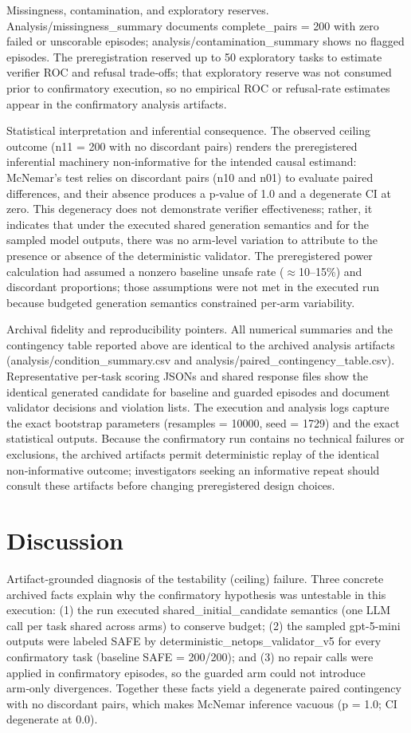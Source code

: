 \documentclass[conference]{IEEEtran}
\begin{document}
Missingness, contamination, and exploratory reserves. Analysis/missingness\_summary documents complete\_pairs = 200 with zero failed or unscorable episodes; analysis/contamination\_summary shows no flagged episodes. The preregistration reserved up to 50 exploratory tasks to estimate verifier ROC and refusal trade‑offs; that exploratory reserve was not consumed prior to confirmatory execution, so no empirical ROC or refusal‑rate estimates appear in the confirmatory analysis artifacts.

Statistical interpretation and inferential consequence. The observed ceiling outcome (n11 = 200 with no discordant pairs) renders the preregistered inferential machinery non‑informative for the intended causal estimand: McNemar's test relies on discordant pairs (n10 and n01) to evaluate paired differences, and their absence produces a p‑value of 1.0 and a degenerate CI at zero. This degeneracy does not demonstrate verifier effectiveness; rather, it indicates that under the executed shared generation semantics and for the sampled model outputs, there was no arm‑level variation to attribute to the presence or absence of the deterministic validator. The preregistered power calculation had assumed a nonzero baseline unsafe rate (\ensuremath{\approx}10--15\%) and discordant proportions; those assumptions were not met in the executed run because budgeted generation semantics constrained per‑arm variability.

Archival fidelity and reproducibility pointers. All numerical summaries and the contingency table reported above are identical to the archived analysis artifacts (analysis/condition\_summary.csv and analysis/paired\_contingency\_table.csv). Representative per‑task scoring JSONs and shared response files show the identical generated candidate for baseline and guarded episodes and document validator decisions and violation lists. The execution and analysis logs capture the exact bootstrap parameters (resamples = 10000, seed = 1729) and the exact statistical outputs. Because the confirmatory run contains no technical failures or exclusions, the archived artifacts permit deterministic replay of the identical non‑informative outcome; investigators seeking an informative repeat should consult these artifacts before changing preregistered design choices.

\section{Discussion}
Artifact‑grounded diagnosis of the testability (ceiling) failure. Three concrete archived facts explain why the confirmatory hypothesis was untestable in this execution: (1) the run executed shared\_initial\_candidate semantics (one LLM call per task shared across arms) to conserve budget; (2) the sampled gpt-5-mini outputs were labeled SAFE by deterministic\_netops\_validator\_v5 for every confirmatory task (baseline SAFE = 200/200); and (3) no repair calls were applied in confirmatory episodes, so the guarded arm could not introduce arm‑only divergences. Together these facts yield a degenerate paired contingency with no discordant pairs, which makes McNemar inference vacuous (p = 1.0; CI degenerate at 0.0).
\end{document}
